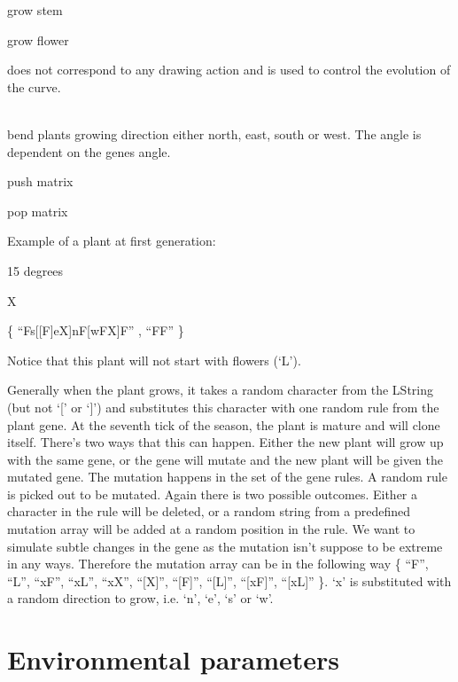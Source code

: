 \documentclass[conference]{acmsiggraph}
\begin{document}
\begin{description}[leftmargin=!,labelindent=0.2in,labelwidth=0.1in]
  \item[F]   grow stem
  \item[L]   grow flower
  \item[X]   does not correspond to any drawing action and is used to control
             the evolution of the curve.\cite{lsystems}
  \item[n, e, s, w] \hfill \\
             bend plants growing direction either north, east, south or west.
             The angle is dependent on the genes angle.
  \item[{[}] push matrix
  \item[{]}] pop matrix
\end{description}

Example of a plant at first generation:

\begin{description}[leftmargin=!,labelindent=0.2in,labelwidth=0.4in]
  \item[Angle] 15 degrees
  \item[Axiom] X
  \item[Rules] \{ ``Fs[[F]eX]nF[wFX]F'' , ``FF'' \}
\end{description}

Notice that this plant will not start with flowers (`L').

Generally when the plant grows, it takes a random character from the LString
(but not `[' or `]') and substitutes this character with one random rule from
the plant gene. At the seventh tick of the season, the plant is mature and will
clone itself. There's two ways that this can happen. Either the new plant will
grow up with the same gene, or the gene will mutate and the new plant will be
given the mutated gene. The mutation happens in the set of the gene rules. A
random rule is picked out to be mutated. Again there is two possible outcomes.
Either a character in the rule will be deleted, or a random string from a
predefined mutation array will be added at a random position in the rule. We
want to simulate subtle changes in the gene as the mutation isn't suppose to be
extreme in any ways. Therefore the mutation array can be in the following way \{
``F'', ``L'', ``xF'', ``xL'', ``xX'', ``[X]'', ``[F]'', ``[L]'', ``[xF]'',
``[xL]'' \}. `x' is substituted with a random direction to grow, i.e. `n', `e',
`s' or `w'.

\section{Environmental parameters}
\end{document}
